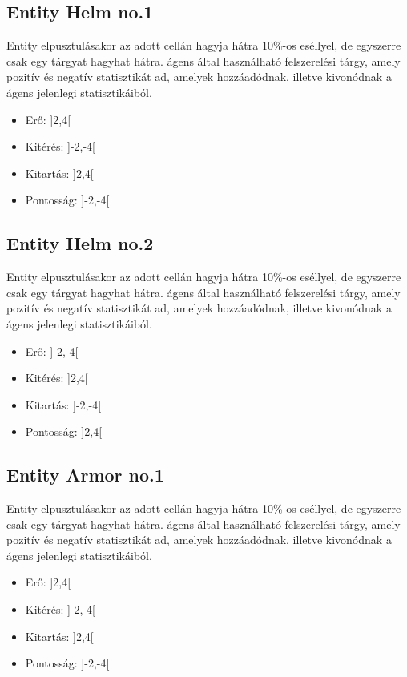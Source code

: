 \subsection{Entity Helm no.1}

Entity elpusztulásakor az adott cellán hagyja hátra 10\%-os eséllyel, de egyszerre csak egy tárgyat hagyhat hátra.
ágens által használható felszerelési tárgy, amely pozitív és negatív statisztikát ad, amelyek hozzáadódnak, illetve kivonódnak a ágens jelenlegi statisztikáiból.

\begin{itemize}
    \item Erő: ]2,4[
    \item Kitérés: ]-2,-4[
    \item Kitartás: ]2,4[
    \item Pontosság: ]-2,-4[
\end{itemize}

\subsection{Entity Helm no.2}

Entity elpusztulásakor az adott cellán hagyja hátra 10\%-os eséllyel, de egyszerre csak egy tárgyat hagyhat hátra.
ágens által használható felszerelési tárgy, amely pozitív és negatív statisztikát ad, amelyek hozzáadódnak, illetve kivonódnak a ágens jelenlegi statisztikáiból.

\begin{itemize}
    \item Erő: ]-2,-4[
    \item Kitérés: ]2,4[
    \item Kitartás: ]-2,-4[
    \item Pontosság: ]2,4[
\end{itemize}

\subsection{Entity Armor no.1}

Entity elpusztulásakor az adott cellán hagyja hátra 10\%-os eséllyel, de egyszerre csak egy tárgyat hagyhat hátra.
ágens által használható felszerelési tárgy, amely pozitív és negatív statisztikát ad, amelyek hozzáadódnak, illetve kivonódnak a ágens jelenlegi statisztikáiból.

\begin{itemize}
    \item Erő: ]2,4[
    \item Kitérés: ]-2,-4[
    \item Kitartás: ]2,4[
    \item Pontosság: ]-2,-4[
\end{itemize}

